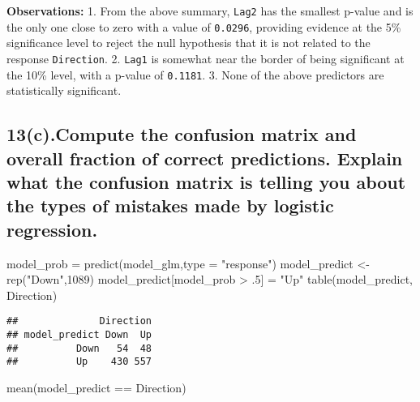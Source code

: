 \documentclass[
]{article}
\newenvironment{Shaded}{\begin{snugshade}}{\end{snugshade}}
\newcommand{\AttributeTok}[1]{\textcolor[rgb]{0.77,0.63,0.00}{#1}}
\newcommand{\DecValTok}[1]{\textcolor[rgb]{0.00,0.00,0.81}{#1}}
\newcommand{\FunctionTok}[1]{\textcolor[rgb]{0.00,0.00,0.00}{#1}}
\newcommand{\NormalTok}[1]{#1}
\newcommand{\OtherTok}[1]{\textcolor[rgb]{0.56,0.35,0.01}{#1}}
\newcommand{\SpecialCharTok}[1]{\textcolor[rgb]{0.00,0.00,0.00}{#1}}
\newcommand{\StringTok}[1]{\textcolor[rgb]{0.31,0.60,0.02}{#1}}
\begin{document}
\textbf{Observations:} 1. From the above summary, \texttt{Lag2} has the
smallest p-value and is the only one close to zero with a value of
\texttt{0.0296}, providing evidence at the 5\% significance level to
reject the null hypothesis that it is not related to the response
\texttt{Direction}. 2. \texttt{Lag1} is somewhat near the border of
being significant at the 10\% level, with a p-value of \texttt{0.1181}.
3. None of the above predictors are statistically significant.

\hypertarget{c.compute-the-confusion-matrix-and-overall-fraction-of-correct-predictions.-explain-what-the-confusion-matrix-is-telling-you-about-the-types-of-mistakes-made-by-logistic-regression.}{%
\subsection{13(c).Compute the confusion matrix and overall fraction of
correct predictions. Explain what the confusion matrix is telling you
about the types of mistakes made by logistic
regression.}\label{c.compute-the-confusion-matrix-and-overall-fraction-of-correct-predictions.-explain-what-the-confusion-matrix-is-telling-you-about-the-types-of-mistakes-made-by-logistic-regression.}}

\begin{Shaded}
\begin{Highlighting}[]
\NormalTok{model\_prob }\OtherTok{=} \FunctionTok{predict}\NormalTok{(model\_glm,}\AttributeTok{type =} \StringTok{"response"}\NormalTok{)}
\NormalTok{model\_predict }\OtherTok{\textless{}{-}} \FunctionTok{rep}\NormalTok{(}\StringTok{"Down"}\NormalTok{,}\DecValTok{1089}\NormalTok{)}
\NormalTok{model\_predict[model\_prob }\SpecialCharTok{\textgreater{}}\NormalTok{ .}\DecValTok{5}\NormalTok{] }\OtherTok{=} \StringTok{"Up"}
\FunctionTok{table}\NormalTok{(model\_predict, Direction)}
\end{Highlighting}
\end{Shaded}

\begin{verbatim}
##              Direction
## model_predict Down  Up
##          Down   54  48
##          Up    430 557
\end{verbatim}

\begin{Shaded}
\begin{Highlighting}[]
\FunctionTok{mean}\NormalTok{(model\_predict }\SpecialCharTok{==}\NormalTok{ Direction)}
\end{Highlighting}
\end{Shaded}
\end{document}
